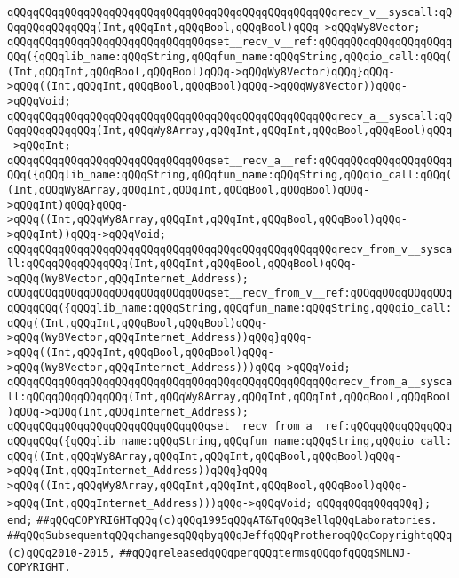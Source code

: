\verb|qQQqqQQqqQQqqQQqqQQqqQQqqQQqqQQqqQQqqQQqqQQqqQQqqQQqrecv_v__syscall:qQQqqQQqqQQqqQQq(Int,qQQqInt,qQQqBool,qQQqBool)qQQq->qQQqWy8Vector;|\newline
\verb|qQQqqQQqqQQqqQQqqQQqqQQqqQQqqQQqset__recv_v__ref:qQQqqQQqqQQqqQQqqQQqqQQq({qQQqlib_name:qQQqString,qQQqfun_name:qQQqString,qQQqio_call:qQQq((Int,qQQqInt,qQQqBool,qQQqBool)qQQq->qQQqWy8Vector)qQQq}qQQq->qQQq((Int,qQQqInt,qQQqBool,qQQqBool)qQQq->qQQqWy8Vector))qQQq->qQQqVoid;|\newline
\newline
\verb|qQQqqQQqqQQqqQQqqQQqqQQqqQQqqQQqqQQqqQQqqQQqqQQqqQQqrecv_a__syscall:qQQqqQQqqQQqqQQq(Int,qQQqWy8Array,qQQqInt,qQQqInt,qQQqBool,qQQqBool)qQQq->qQQqInt;|\newline
\verb|qQQqqQQqqQQqqQQqqQQqqQQqqQQqqQQqset__recv_a__ref:qQQqqQQqqQQqqQQqqQQqqQQq({qQQqlib_name:qQQqString,qQQqfun_name:qQQqString,qQQqio_call:qQQq((Int,qQQqWy8Array,qQQqInt,qQQqInt,qQQqBool,qQQqBool)qQQq->qQQqInt)qQQq}qQQq->qQQq((Int,qQQqWy8Array,qQQqInt,qQQqInt,qQQqBool,qQQqBool)qQQq->qQQqInt))qQQq->qQQqVoid;|\newline
\newline
\verb|qQQqqQQqqQQqqQQqqQQqqQQqqQQqqQQqqQQqqQQqqQQqqQQqqQQqrecv_from_v__syscall:qQQqqQQqqQQqqQQq(Int,qQQqInt,qQQqBool,qQQqBool)qQQq->qQQq(Wy8Vector,qQQqInternet_Address);|\newline
\verb|qQQqqQQqqQQqqQQqqQQqqQQqqQQqqQQqset__recv_from_v__ref:qQQqqQQqqQQqqQQqqQQqqQQq({qQQqlib_name:qQQqString,qQQqfun_name:qQQqString,qQQqio_call:qQQq((Int,qQQqInt,qQQqBool,qQQqBool)qQQq->qQQq(Wy8Vector,qQQqInternet_Address))qQQq}qQQq->qQQq((Int,qQQqInt,qQQqBool,qQQqBool)qQQq->qQQq(Wy8Vector,qQQqInternet_Address)))qQQq->qQQqVoid;|\newline
\newline
\verb|qQQqqQQqqQQqqQQqqQQqqQQqqQQqqQQqqQQqqQQqqQQqqQQqqQQqrecv_from_a__syscall:qQQqqQQqqQQqqQQq(Int,qQQqWy8Array,qQQqInt,qQQqInt,qQQqBool,qQQqBool)qQQq->qQQq(Int,qQQqInternet_Address);|\newline
\verb|qQQqqQQqqQQqqQQqqQQqqQQqqQQqqQQqset__recv_from_a__ref:qQQqqQQqqQQqqQQqqQQqqQQq({qQQqlib_name:qQQqString,qQQqfun_name:qQQqString,qQQqio_call:qQQq((Int,qQQqWy8Array,qQQqInt,qQQqInt,qQQqBool,qQQqBool)qQQq->qQQq(Int,qQQqInternet_Address))qQQq}qQQq->qQQq((Int,qQQqWy8Array,qQQqInt,qQQqInt,qQQqBool,qQQqBool)qQQq->qQQq(Int,qQQqInternet_Address)))qQQq->qQQqVoid;|\newline
\newline
\verb|qQQqqQQqqQQqqQQq};|\newline
\verb|end;|\newline
\newline
\newline
\verb|##qQQqCOPYRIGHTqQQq(c)qQQq1995qQQqAT&TqQQqBellqQQqLaboratories.|\newline
\verb|##qQQqSubsequentqQQqchangesqQQqbyqQQqJeffqQQqProtheroqQQqCopyrightqQQq(c)qQQq2010-2015,|\newline
\verb|##qQQqreleasedqQQqperqQQqtermsqQQqofqQQqSMLNJ-COPYRIGHT.|\newline

